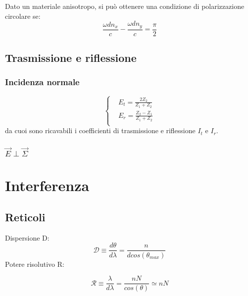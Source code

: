 \documentclass{article}
\begin{document}
Dato un materiale anisotropo, si può ottenere una condizione di polarizzazione circolare se:
\begin{equation}
    \frac{\omega d n_x}{c} -  \frac{\omega d n_y}{c}= \frac{\pi}{2}
\end{equation}


\subsection{Trasmissione e riflessione}
\subsubsection{Incidenza normale}
\begin{equation}
    \left\{
    \begin{aligned}
        & E_t= \frac{2Z_2}{Z_1+Z_2} \\
        & E_r= \frac{Z_2-Z_1}{Z_1+Z_2} \\
    \end{aligned}
    \right.
\end{equation}
da cuoi sono ricavabili i coefficienti di trasmissione e riflessione $I_t$ e $I_r$.

\subsubsection{$\Vec{E}\perp\Vec{\Sigma}$ }




\section{Interferenza}
\subsection{Reticoli}
Dispersione D:
\begin{equation}
\mathcal{D}\equiv \frac{d\theta}{d \lambda}= \frac{n}{dcos(\theta_{max})}
\end{equation}
Potere risolutivo R:

\begin{equation}
\mathcal{R}\equiv \frac{\lambda}{d \lambda}= \frac{nN}{cos(\theta)}\simeq nN
\end{equation}
\end{document}
